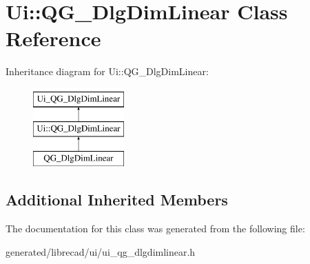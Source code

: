 \hypertarget{classUi_1_1QG__DlgDimLinear}{\section{Ui\-:\-:Q\-G\-\_\-\-Dlg\-Dim\-Linear Class Reference}
\label{classUi_1_1QG__DlgDimLinear}
}
Inheritance diagram for Ui\-:\-:Q\-G\-\_\-\-Dlg\-Dim\-Linear\-:\begin{figure}[H]
\begin{center}
\leavevmode
\includegraphics[height=3.000000cm]{classUi_1_1QG__DlgDimLinear}
\end{center}
\end{figure}
\subsection*{Additional Inherited Members}


The documentation for this class was generated from the following file\-:\begin{DoxyCompactItemize}
\item 
generated/librecad/ui/ui\-\_\-qg\-\_\-dlgdimlinear.\-h\end{DoxyCompactItemize}
